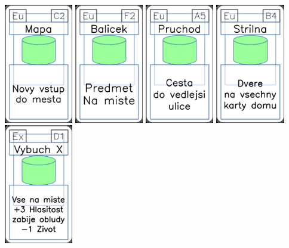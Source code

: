 \documentclass[a4paper]{article}
\begin{document}
	\includegraphics[width=3.0cm]{img-4_41}
	\includegraphics[width=3.0cm]{img-4_26}
	\includegraphics[width=3.0cm]{img-4_34}
	\includegraphics[width=3.0cm]{img-4_38}
	\includegraphics[width=3.0cm]{img-4_15}
\end{document}
